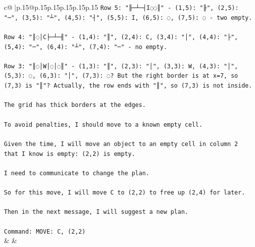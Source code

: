 \documentclass{article}
\begin{document}
{\begin{supertabular}{c@{$\;$}|p{.15\linewidth}@{}p{.15\linewidth}p{.15\linewidth}p{.15\linewidth}p{.15\linewidth}p{.15\linewidth}}
{{{\texttt{Row 5: "╟─┴─┤I◌◌║" {-} (1,5): "╟", (2,5): "─", (3,5): "┴", (4,5): "┤", (5,5): I, (6,5): ◌, (7,5): ◌ {-} two empty.} \\
\\ 
\texttt{Row 4: "║◌│C├─┴─╢" {-} (1,4): "║", (2,4): C, (3,4): "│", (4,4): "├", (5,4): "─", (6,4): "┴", (7,4): "─" {-} no empty.} \\
\\ 
\texttt{Row 3: "║◌│W│◌│◌║" {-} (1,3): "║", (2,3): "│", (3,3): W, (4,3): "│", (5,3): ◌, (6,3): "│", (7,3): ◌? But the right border is at x=7, so (7,3) is "║"? Actually, the row ends with "║", so (7,3) is not inside.} \\
\\ 
\texttt{The grid has thick borders at the edges.} \\
\\ 
\texttt{To avoid penalties, I should move to a known empty cell.} \\
\\ 
\texttt{Given the time, I will move an object to an empty cell in column 2 that I know is empty: (2,2) is empty.} \\
\\ 
\texttt{I need to communicate to change the plan.} \\
\\ 
\texttt{So for this move, I will move C to (2,2) to free up (2,4) for later.} \\
\\ 
\texttt{Then in the next message, I will suggest a new plan.} \\
\\ 
\texttt{Command: MOVE: C, (2,2)} \\
            }
        }
    }
    & & \\ \\


\end{supertabular}}
\end{document}
